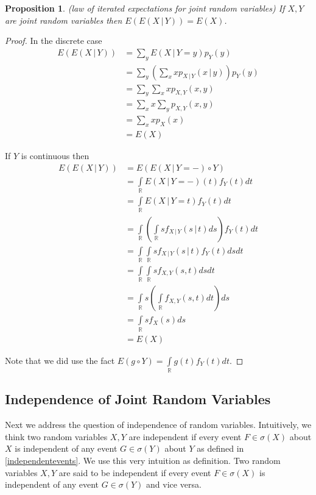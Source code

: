 \documentclass[12pt]{amsart}
\newtheorem{proposition}[theorem]{Proposition}
\theoremstyle{definition}
\begin{document}
\begin{proposition} \label{iterated_expectation_for_joint_binomial_distribution} (law of iterated expectations for joint random variables) If $X, Y$ are joint random variables then $E(E(X \,|\, Y)) = E(X)$.
\end{proposition}
\begin{proof} In the discrete case
\begin{align*}
E(E(X \,|\, Y)) & = \sum\limits_yE(X \,|\, Y = y)p_Y(y) \\
 & = \sum\limits_y (\sum\limits_x x p_{X \,|\, Y}(x \,|\, y)) p_Y(y) \\
 & = \sum\limits_y \sum\limits_x x p_{X, Y}(x, y) \\
 & = \sum\limits_x x \sum\limits_y p_{X, Y}(x, y) \\
 & = \sum\limits_x x p_X(x) \\
 & = E(X)
\end{align*}

If $Y$ is continuous then
\begin{align*}
E(E(X \,|\, Y)) & = E(E(X \,|\, Y = -) \circ Y) \\
 & = \int\limits_{\mathbb{R}} E(X \,|\, Y = -)(t) f_Y(t) dt \\
 & = \int\limits_{\mathbb{R}} E(X \,|\, Y = t) f_Y(t)dt \\
 & = \int\limits_{\mathbb{R}} \left( \int\limits_{\mathbb{R}} s f_{X \,|\, Y}(s \,|\, t) ds \right) f_Y(t) dt \\
 & = \int\limits_{\mathbb{R}} \int\limits_{\mathbb{R}} s f_{X \,|\, Y} (s \,|\, t)f_Y(t) ds dt \\
 & = \int\limits_{\mathbb{R}} \int\limits_{\mathbb{R}} s f_{X, Y}(s, t) ds dt \\
 & = \int\limits_{\mathbb{R}} s \left( \int\limits_{\mathbb{R}} f_{X, Y}(s, t) dt \right) ds \\
 & = \int\limits_{\mathbb{R}} s f_X(s) ds \\
 & = E(X)
\end{align*}

Note that we did use the fact $E(g \circ Y) = \int\limits_{\mathbb{R}} g(t)f_Y(t) dt$.
\end{proof}

\subsection{Independence of Joint Random Variables} Next we address the question of independence of random variables. Intuitively, we think two random variables $X, Y$ are independent if every event $F \in \sigma(X)$ about $X$ is independent of any event $G \in \sigma(Y)$ about $Y$ as defined in \ref{independentevents}. We use this very intuition as definition.
\dfn\label{independence_of_XY} Two random variables $X, Y$ are said to be independent if every event $F \in \sigma(X)$ is independent of any event $G \in \sigma(Y)$ and vice versa.
\end{document}
